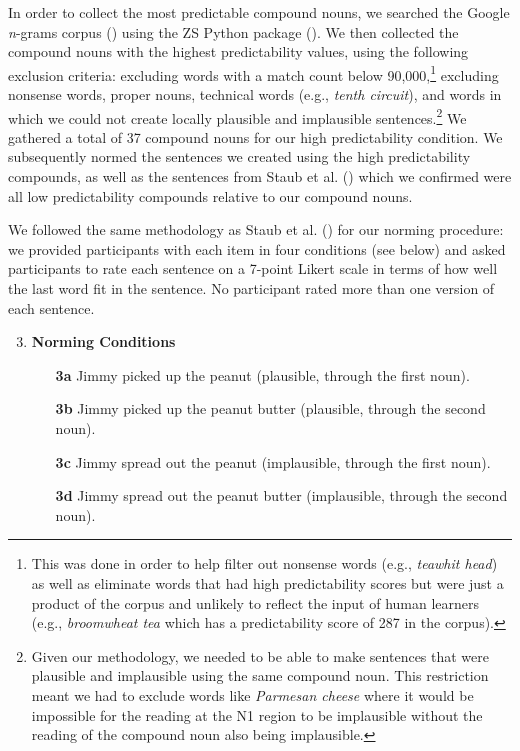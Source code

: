 \documentclass[
  12pt,
  letterpaper,
]{scrreprt}
\begin{document}
In order to collect the most predictable compound nouns, we searched the
Google \emph{n}-grams corpus
() using the ZS Python package
(). We then collected
the compound nouns with the highest predictability values, using the
following exclusion criteria: excluding words with a match count below
90,000,\footnote{This was done in order to help filter out nonsense
  words (e.g., \emph{teawhit head}) as well as eliminate words that had
  high predictability scores but were just a product of the corpus and
  unlikely to reflect the input of human learners (e.g.,
  \emph{broomwheat tea} which has a predictability score of 287 in the
  corpus).} excluding nonsense words, proper nouns, technical words
(e.g., \emph{tenth circuit}), and words in which we could not create
locally plausible and implausible sentences.\footnote{Given our
  methodology, we needed to be able to make sentences that were
  plausible and implausible using the same compound noun. This
  restriction meant we had to exclude words like \emph{Parmesan cheese}
  where it would be impossible for the reading at the N1 region to be
  implausible without the reading of the compound noun also being
  implausible.} We gathered a total of 37 compound nouns for our high
predictability condition. We subsequently normed the sentences we
created using the high predictability compounds, as well as the
sentences from Staub et al.
() which we
confirmed were all low predictability compounds relative to our compound
nouns.

We followed the same methodology as Staub et al.
() for our norming
procedure: we provided participants with each item in four conditions
(see below) and asked participants to rate each sentence on a 7-point
Likert scale in terms of how well the last word fit in the sentence. No
participant rated more than one version of each sentence.

\begin{enumerate} \setcounter{enumi}{2}
   \item \textbf{Norming Conditions}
    \begin{enumerate}
        \item[\textbf{3a}] Jimmy picked up the peanut (plausible, through the first noun).
        \item[\textbf{3b}] Jimmy picked up the peanut butter (plausible, through the second noun).
        \item[\textbf{3c}] Jimmy spread out the peanut (implausible, through the first noun).
        \item[\textbf{3d}] Jimmy spread out the peanut butter (implausible, through the second noun).
    \end{enumerate} \label{figanext}
\end{enumerate}
\end{document}
